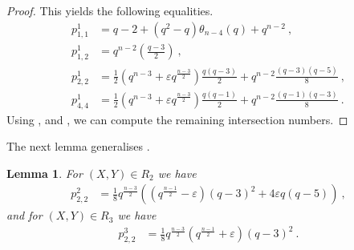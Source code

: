 \documentclass[a4paper]{article}
\newtheorem{lm}[thm]{Lemma}
\theoremstyle{definition}
\newcommand{\eps}{\varepsilon}
\newcommand{\vspan}[1]{\left \langle #1 \right \rangle}
\newcommand{\pg}{\textnormal{PG}}
\newcommand{\mq}{\mathcal Q}
\begin{document}
\begin{proof}
 This yields the following equalities.
 \begin{align*}
        p^{1}_{1,1}&=q-2+(q^{2}-q)\theta_{n-4}(q)+q^{n-2}\:,\\
        p^{1}_{1,2}&=q^{n-2}\left(\frac{q-3}{2}\right)\:,\\
        p^{1}_{2,2}&=\frac{1}{2}\left(q^{n-3}+\varepsilon q^{\frac{n-3}{2}}\right)\frac{q(q-3)}{2}+q^{n-2}\frac{(q-3)(q-5)}{8}\:,\\
        p^1_{4,4} &= \frac{1}{2}\left(q^{n-3}+\varepsilon q^{\frac{n-3}{2}}\right) \frac{q(q-1)}2 + q^{n-2} \frac{(q-1)(q-3)}8\:.
 \end{align*}
 Using ,  and , we can compute the remaining intersection numbers.
\end{proof}

The next lemma generalises \cite[Theorem 12.2.1]{bcn}.

\begin{lm}\label{lem:p222}
    For $(X,Y)\in R_{2}$ we have
    \begin{align*}
        p^{2}_{2,2}&=\frac{1}{8}q^{\frac{n-3}{2}}\left(\left(q^{\frac{n-1}{2}}-\eps\right)(q-3)^{2}+4\eps q(q-5)\right)\:,
    \end{align*}
    and for $(X,Y)\in R_{3}$ we have
    \begin{align*}
        p^{3}_{2,2}&=\frac{1}{8}q^{\frac{n-3}{2}}\left(q^{\frac{n-1}{2}}+\eps\right)(q-3)^{2}\:.
    \end{align*}
\end{lm}
\end{document}
